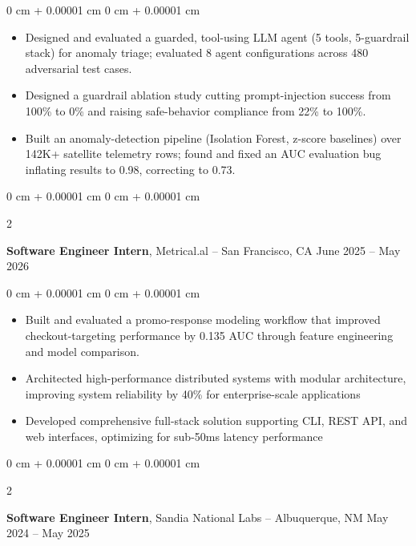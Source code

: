 \documentclass[10pt, letterpaper]{article}
\newenvironment{highlights}{
    \begin{itemize}[
        topsep=0.06 cm,
        parsep=0.06 cm,
        partopsep=0pt,
        itemsep=0pt,
        leftmargin=0 cm + 10pt
    ]
}{
    \end{itemize}
}
\newenvironment{onecolentry}{
    \begin{adjustwidth}{
        0 cm + 0.00001 cm
    }{
        0 cm + 0.00001 cm
    }
}{
    \end{adjustwidth}
}
\newenvironment{twocolentry}[2][]{
    \onecolentry
    \def\secondColumn{#2}
    \setcolumnwidth{\fill, 4.5 cm}
    \begin{paracol}{2}
}{
    \switchcolumn \raggedleft \secondColumn
    \end{paracol}
    \endonecolentry
}
\begin{document}
\vspace{0.06 cm}
\begin{onecolentry}
    \begin{highlights}
        \item Designed and evaluated a guarded, tool-using LLM agent (5 tools, 5-guardrail stack) for anomaly triage; evaluated 8 agent configurations across 480 adversarial test cases.
        \item Designed a guardrail ablation study cutting prompt-injection success from 100\% to 0\% and raising safe-behavior compliance from 22\% to 100\%.
        \item Built an anomaly-detection pipeline (Isolation Forest, z-score baselines) over 142K+ satellite telemetry rows; found and fixed an AUC evaluation bug inflating results to 0.98, correcting to 0.73.
    \end{highlights}
\end{onecolentry}

\begin{twocolentry}{
    June 2025 -- May 2026
}
    \textbf{Software Engineer Intern}, Metrical.al -- San Francisco, CA\end{twocolentry}

\vspace{0.06 cm}
\begin{onecolentry}
    \begin{highlights}
        \item Built and evaluated a promo-response modeling workflow that improved checkout-targeting performance by 0.135 AUC through feature engineering and model comparison.
        \item Architected high-performance distributed systems with modular architecture, improving system reliability by 40\% for enterprise-scale applications
        \item Developed comprehensive full-stack solution supporting CLI, REST API, and web interfaces, optimizing for sub-50ms latency performance
    \end{highlights}
\end{onecolentry}

\begin{twocolentry}{
    May 2024 -- May 2025
}
    \textbf{Software Engineer Intern}, Sandia National Labs -- Albuquerque, NM\end{twocolentry}
\end{document}

